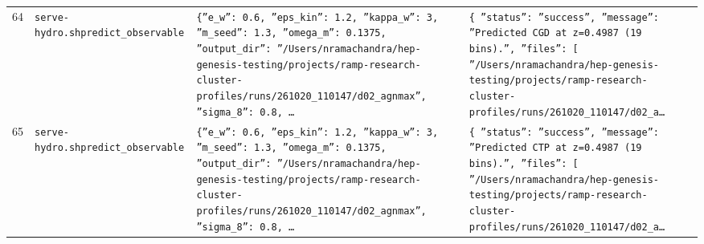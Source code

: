 \documentclass[11pt,a4paper]{article}
\begin{document}
\begin{longtable}{@{}p{}p{}p{}p{}@{}}
64 & \texttt{serve-hydro.sh}\newline\texttt{predict\_\allowbreak{}observable} & \texttt{\{''e\_\allowbreak{}w'':\allowbreak{} 0.6,\allowbreak{} ''eps\_\allowbreak{}kin'':\allowbreak{} 1.2,\allowbreak{} ''kappa\_\allowbreak{}w'':\allowbreak{} 3,\allowbreak{} ''m\_\allowbreak{}seed'':\allowbreak{} 1.3,\allowbreak{} ''omega\_\allowbreak{}m'':\allowbreak{} 0.1375,\allowbreak{} ''output\_\allowbreak{}dir'':\allowbreak{} ''/\allowbreak{}Users/\allowbreak{}nramachandra/\allowbreak{}hep-genesis-testing/\allowbreak{}projects/\allowbreak{}ramp-research-cluster-profiles/\allowbreak{}runs/\allowbreak{}261020\_\allowbreak{}110147/\allowbreak{}d02\_\allowbreak{}agnmax'',\allowbreak{} ''sigma\_\allowbreak{}8'':\allowbreak{} 0.8,\allowbreak{} \ldots{}\allowbreak{}} & \texttt{\{   ''status'':\allowbreak{} ''success'',\allowbreak{}   ''message'':\allowbreak{} ''Predicted CGD at z=\allowbreak{}0.4987 (19 bins)\allowbreak{}.'',\allowbreak{}   ''files'':\allowbreak{} [     ''/\allowbreak{}Users/\allowbreak{}nramachandra/\allowbreak{}hep-genesis-testing/\allowbreak{}projects/\allowbreak{}ramp-research-cluster-profiles/\allowbreak{}runs/\allowbreak{}261020\_\allowbreak{}110147/\allowbreak{}d02\_\allowbreak{}a\ldots{}\allowbreak{}} \\
65 & \texttt{serve-hydro.sh}\newline\texttt{predict\_\allowbreak{}observable} & \texttt{\{''e\_\allowbreak{}w'':\allowbreak{} 0.6,\allowbreak{} ''eps\_\allowbreak{}kin'':\allowbreak{} 1.2,\allowbreak{} ''kappa\_\allowbreak{}w'':\allowbreak{} 3,\allowbreak{} ''m\_\allowbreak{}seed'':\allowbreak{} 1.3,\allowbreak{} ''omega\_\allowbreak{}m'':\allowbreak{} 0.1375,\allowbreak{} ''output\_\allowbreak{}dir'':\allowbreak{} ''/\allowbreak{}Users/\allowbreak{}nramachandra/\allowbreak{}hep-genesis-testing/\allowbreak{}projects/\allowbreak{}ramp-research-cluster-profiles/\allowbreak{}runs/\allowbreak{}261020\_\allowbreak{}110147/\allowbreak{}d02\_\allowbreak{}agnmax'',\allowbreak{} ''sigma\_\allowbreak{}8'':\allowbreak{} 0.8,\allowbreak{} \ldots{}\allowbreak{}} & \texttt{\{   ''status'':\allowbreak{} ''success'',\allowbreak{}   ''message'':\allowbreak{} ''Predicted CTP at z=\allowbreak{}0.4987 (19 bins)\allowbreak{}.'',\allowbreak{}   ''files'':\allowbreak{} [     ''/\allowbreak{}Users/\allowbreak{}nramachandra/\allowbreak{}hep-genesis-testing/\allowbreak{}projects/\allowbreak{}ramp-research-cluster-profiles/\allowbreak{}runs/\allowbreak{}261020\_\allowbreak{}110147/\allowbreak{}d02\_\allowbreak{}a\ldots{}\allowbreak{}} \\

\end{longtable}
\end{document}
